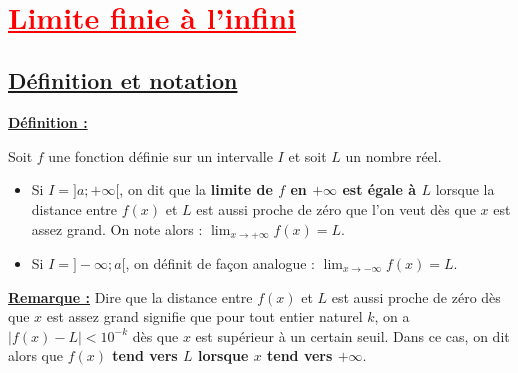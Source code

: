 \documentclass[11pt,a4paper]{article}
\newenvironment{definition}{
\vspace{-0.25cm}
\blue
\begin{framed}
\textbf{\underline{Définition :}} \par
\medskip
}
{
\end{framed}
\vspace{-0.25cm}
}
\begin{document}
\renewcommand \footrulewidth{.2pt}
\pagestyle{fancy}
\thispagestyle{empty}

~~\vspace{-2cm}

\begin{center}  \end{center}



\section{\textcolor{red}{\underline{Limite finie à l'infini}}}

\subsection{\textcolor{vert}{\underline{Définition et notation}}}

\begin{definition}
Soit $f$ une fonction définie sur un intervalle $I$ et soit $L$ un nombre réel. \par 
\begin{itemize}
\item Si $I =]a ; +\infty[$, on dit que la \textbf{limite de $f$ en $+\infty$ est égale à $L$} lorsque la distance entre $f(x)$ et $L$ est aussi proche de zéro que l'on veut dès que $x$ est assez grand. On note alors : $\displaystyle{\lim_{x \to +\infty} f(x) = L}$.
\item Si $I =]-\infty ; a[$, on définit de façon analogue : $\displaystyle{\lim_{x \to -\infty} f(x) = L}$.
\end{itemize}
\end{definition}

\medskip

\textbf{\underline{Remarque :}} Dire que \og la distance entre $f(x)$ et $L$ est aussi proche de zéro dès que $x$ est assez grand \fg{} signifie que pour tout entier naturel $k$, on a $\vert f( x ) - L \vert < 10^{- k}$ dès que $x$ est supérieur à un certain seuil. Dans ce cas, on dit alors que \textbf{$f(x)$ tend vers $L$ lorsque $x$ tend vers $+\infty$}.

\bigskip
\end{document}

